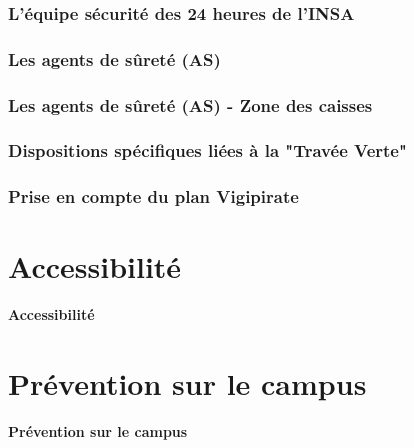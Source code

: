 \documentclass{beamer}
\begin{document}
\begin{frame}

\frametitle{L'équipe sécurité des 24 heures de l'INSA}

\end{frame}

\begin{frame}

\frametitle{Les agents de sûreté (AS)}

\end{frame}

\begin{frame}

\frametitle{Les agents de sûreté (AS) - Zone des caisses}

\end{frame}

\begin{frame}

\frametitle{Dispositions spécifiques liées à la "Travée Verte"}

\end{frame}

\begin{frame}

\frametitle{Prise en compte du plan Vigipirate}

\end{frame}


\section{Accessibilité}

\begin{frame}

\centering\Huge{\textbf{Accessibilité}}

\end{frame}

\begin{frame}
\end{frame}


\section{Prévention sur le campus}

\begin{frame}

\centering\Huge{\textbf{Prévention sur le campus}}

\end{frame}
\end{document}
